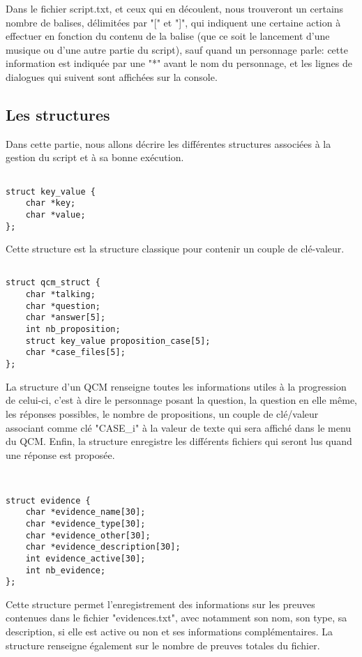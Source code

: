 	Dans le fichier script.txt, et ceux qui en découlent, nous trouveront un certains nombre de balises, délimitées par "[" et "]", qui indiquent une certaine action à effectuer en fonction du contenu de la balise (que ce soit le lancement d'une musique ou d'une autre partie du script), sauf quand un personnage parle: cette information est indiquée par une "*" avant le nom du personnage, et les lignes de dialogues qui suivent sont affichées sur la console.


\subsection{Les structures}

	Dans cette partie, nous allons décrire les différentes structures associées à la gestion du script et à sa bonne exécution.

\begin{verbatim}

struct key_value {
	char *key;
	char *value;
};
\end{verbatim}

	Cette structure est la structure classique pour contenir un couple de clé-valeur.

\begin{verbatim}

struct qcm_struct {
	char *talking;
	char *question;
	char *answer[5];
	int nb_proposition;
	struct key_value proposition_case[5];
	char *case_files[5];
};
\end{verbatim}

	La structure d'un QCM renseigne toutes les informations utiles à la progression de celui-ci, c'est à dire le personnage posant la question, la question en elle même, les réponses possibles, le nombre de propositions, un couple de clé/valeur associant comme clé "CASE_i" à la valeur de texte qui sera affiché dans le menu du QCM. Enfin, la structure enregistre les différents fichiers qui seront lus quand une réponse est proposée.

\begin{verbatim}


struct evidence {
	char *evidence_name[30];
	char *evidence_type[30];
	char *evidence_other[30];
	char *evidence_description[30];
	int evidence_active[30];
	int nb_evidence;
};
\end{verbatim}

	Cette structure permet l'enregistrement des informations sur les preuves contenues dans le fichier "evidences.txt", avec notamment son nom, son type, sa description, si elle est active ou non et ses informations complémentaires. La structure renseigne également sur le nombre de preuves totales du fichier.

